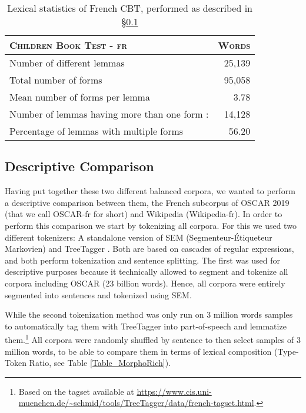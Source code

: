 \begin{table}[ht]
    \centering\small
    \begin{tabular}{lr}                                                             \\\toprule
        {\textsc{Children Book Test - fr}}           & { \textsc{Words}} \\\midrule
        Number of different lemmas                   & 25,139            \\
        Total number of forms                        & 95,058            \\
        Mean number of forms per lemma               & 3.78              \\
        Number of lemmas having more than one form : & 14,128            \\
        Percentage of lemmas with multiple forms     & 56.20             \\
        \bottomrule
    \end{tabular}
    \caption{\label{Table_DescribeCBTfr} Lexical statistics of French CBT, performed as described in §\ref{sec:CompareCorpora}}
\end{table}

\subsection{Descriptive Comparison} \label{sec:CompareCorpora}

Having put together these two different balanced corpora, we wanted to perform a descriptive comparison between them, the French subcorpus of OSCAR 2019 (that we call OSCAR-fr for short) and Wikipedia (Wikipedia-fr). In order to perform this comparison we start by tokenizing all corpora. For this we used two different tokenizers: A standalone version of SEM (Segmenteur-Étiqueteur Markovien) \citep{dupont-2017-exploration} and TreeTagger \citep{schmid-1999-improvements}. Both are based on cascades of regular expressions, and both perform tokenization and sentence splitting. The first was used for descriptive purposes because it technically allowed to segment and tokenize all corpora including OSCAR (23 billion words). Hence, all corpora were entirely segmented into sentences and tokenized using SEM.

While the second tokenization method was only run on 3 million words samples to automatically tag them with TreeTagger into part-of-speech and lemmatize them.\footnote{Based on the tagset available at \url{https://www.cis.uni-muenchen.de/~schmid/tools/TreeTagger/data/french-tagset.html}.} All corpora were randomly shuffled by sentence to then select samples of 3 million words, to be able to compare them in terms of lexical composition (Type-Token Ratio, see Table \ref{Table_MorphoRich}).

